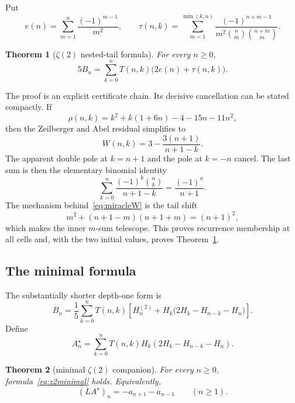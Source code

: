 \documentclass[11pt,reqno]{amsart}
\newtheorem{theorem}{Theorem}[section]
\theoremstyle{definition}
\theoremstyle{remark}
\newcommand{\bin}[2]{\binom{#1}{#2}}
\begin{document}
Put
\[
 e(n)=\sum_{m=1}^n\frac{(-1)^{m-1}}{m^2},\qquad
 \tau(n,k)=\sum_{m=1}^{\min(k,n)}
 \frac{(-1)^{n+m-1}}{m^2\bin nm\bin{n+m}m}.
\]

\begin{theorem}[$\zeta(2)$ nested-tail formula]\label{thm:z2tail}
For every $n\geq0$,
\begin{equation}\label{eq:z2tail}
 5B_n=\sum_{k=0}^nT(n,k)\bigl(2e(n)+\tau(n,k)\bigr).
\end{equation}
\end{theorem}

The proof is an explicit certificate chain.  Its decisive cancellation can be
stated compactly.  If
\[
 \rho(n,k)=k^2+k(1+6n)-4-15n-11n^2,
\]
then the Zeilberger and Abel residual simplifies to
\begin{equation}\label{eq:miracleW}
 W(n,k)=3-\frac{3(n+1)}{n+1-k}.
\end{equation}
The apparent double pole at $k=n+1$ and the pole at $k=-n$ cancel.  The last
sum is then the elementary binomial identity
\[
 \sum_{k=0}^n\frac{(-1)^k\bin nk}{n+1-k}=\frac{(-1)^n}{n+1}.
\]
The mechanism behind~\eqref{eq:miracleW} is the tail shift
\[
 m^2+(n+1-m)(n+1+m)=(n+1)^2,
\]
which makes the inner $m$-sum telescope.  This proves recurrence membership at
all cells and, with the two initial values, proves
Theorem~\ref{thm:z2tail}.

\subsection{The minimal formula}

The substantially shorter depth-one form is
\begin{equation}\label{eq:z2minimal}
 B_n=\frac15\sum_{k=0}^nT(n,k)
 \left[H_n^{(2)}+H_k\bigl(2H_k-H_{n-k}-H_n\bigr)\right].
\end{equation}
Define
\[
 A_n^\star=\sum_{k=0}^nT(n,k)H_k(2H_k-H_{n-k}-H_n).
\]

\begin{theorem}[minimal $\zeta(2)$ companion]\label{thm:z2minimal}
For every $n\geq0$, formula~\eqref{eq:z2minimal} holds.  Equivalently,
\begin{equation}\label{eq:L2}
 (LA^\star)_n=-a_{n+1}-a_{n-1}\qquad(n\geq1).
\end{equation}
\end{theorem}
\end{document}
